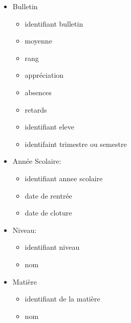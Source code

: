 \documentclass[12pt,a4paper]{article}
\begin{document}
\begin{itemize}
\item Bulletin
	\begin{itemize}
		\item identifiant bulletin
		\item moyenne
		\item rang
		\item appréciation
		\item absences
		\item retards
		\item identifiant eleve
		\item identifaint trimestre ou semestre
	\end{itemize}

\item Année Scolaire:
	\begin{itemize}
		\item identifiant annee scolaire
		\item date de rentrée
		\item date de cloture
	\end{itemize}

\item Niveau:
	\begin{itemize}
		\item identifiant niveau
		\item nom
	\end{itemize}

\item Matière
	\begin{itemize}
		\item identifiant de la matière
		\item nom
	\end{itemize}
\end{itemize}
\end{document}
